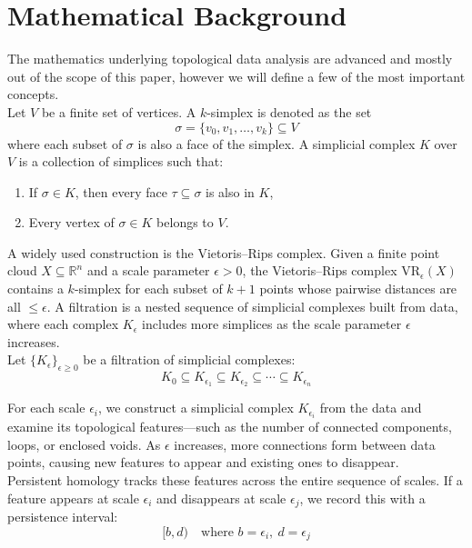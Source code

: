 \documentclass[12pt]{exam}
\begin{document}
\section{Mathematical Background}

The mathematics underlying topological data analysis are advanced and mostly out of the scope of this paper, however we will define a few of the most important concepts.  \\



Let \( V \) be a finite set of vertices. A \(k\)-simplex is  denoted as the set
\[
\sigma = \{v_0, v_1, \ldots, v_k\} \subseteq V
\]
where each subset of \( \sigma \) is also a face of the simplex. A simplicial complex \( K \) over \( V \) is a collection of simplices such that:
\begin{enumerate}
    \item If \( \sigma \in K \), then every face \( \tau \subseteq \sigma \) is also in \( K \),
    \item Every vertex of \( \sigma \in K \) belongs to \( V \).
\end{enumerate}

A widely used construction is the Vietoris–Rips complex. Given a finite  point cloud \( X \subseteq \mathbb{R}^n \) and a scale parameter \( \epsilon > 0 \), the Vietoris–Rips complex \( \mathrm{VR}_\epsilon(X) \) contains a \( k \)-simplex for each subset of \( k+1 \) points whose pairwise distances are all \( \leq \epsilon \). A filtration is a nested sequence of simplicial complexes built from data, where each complex $K_\epsilon$ includes more simplices as the scale parameter $\epsilon$ increases. \\



Let \( \{K_\epsilon\}_{\epsilon \geq 0} \) be a filtration of simplicial complexes:
\[
K_0 \subseteq K_{\epsilon_1} \subseteq K_{\epsilon_2} \subseteq \cdots \subseteq K_{\epsilon_n}
\]

For each scale \( \epsilon_i \), we construct a simplicial complex \( K_{\epsilon_i} \) from the data and examine its topological features—such as the number of connected components, loops, or enclosed voids. As \( \epsilon \) increases, more connections form between data points, causing new features to appear and existing ones to disappear. \\

Persistent homology tracks these features across the entire sequence of scales. If a feature appears at scale \( \epsilon_i \) and disappears at scale \( \epsilon_j \), we record this with a persistence interval:
\[
[b, d) \quad \text{where } b = \epsilon_i, \ d = \epsilon_j
\]
\end{document}
